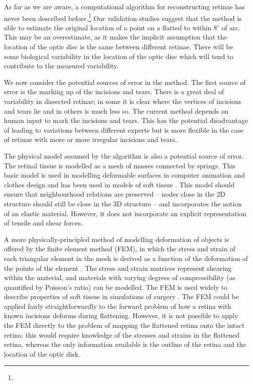 \documentclass[10pt]{article}
\begin{document}
As far as we are aware, a computational algorithm for reconstructing
retinae has never been described
before.\footnote{} Our validation
studies suggest that the method is able to estimate the original
location of a point on a flatted to within 8$^\circ$ of arc. This may
be an overestimate, as it makes the implicit assumption that the
location of the optic disc is the same between different retinae.
There will be some biological variability in the location of the
optic disc which will tend to contribute to the measured variability.

We now consider the potential sources of error in the method. The
first source of error is the marking up of the incisions and
tears. There is a great deal of variability in dissected retinae; in
some it is clear where the vertices of incisions and tears lie and in
others is much less so. The current method depends on human input to
mark the incisions and tears. This has the potential disadvantage of
leading to variations between different experts but is more flexible
in the case of retinae with more or more irregular incisions and
tears. 

The physical model assumed by the algorithm is also a potential source
of error. The retinal tissue is modelled as a mesh of masses connected
by springs. This basic model is used in modelling deformable surfaces
in computer animation and clothes design
\cite{FanEtal98spri,MaCaEtal99flat,WangEtal02surf} and has been used
in models of soft tissue \cite{SkriDunc99real}.  This model should
ensure that neighbourhood relations are preserved -- nodes close in
the 2D structure should still be close in the 3D structure -- and
incorporates the notion of an elastic material. However, it does not
incorporate an explicit representation of tensile and shear forces.

A more physically-principled method of modelling deformation of
objects is offered by the finite element method (FEM), in which the
stress and strain of each triangular element in the mesh is derived as
a function of the deformation of the points of the element
\cite{ZienTayl00fini}. The stress and strain matrices represent
shearing within the material, and materials with varying degrees of
compressibility (as quantified by Poisson's ratio) can be modelled.
The FEM is used widely to describe properties of soft tissue in
simulations of surgery \cite{CartEtal05appl}. The FEM could be applied
fairly straightforwardly to the forward problem of how a retina with
known incisions deforms during flattening. However, it is not possible
to apply the FEM directly to the problem of mapping the flattened
retina onto the intact retina: this would require knowledge of the
stresses and strains in the flattened retina, whereas the only
information available is the outline of the retina and the location of
the optic disk.
\end{document}
